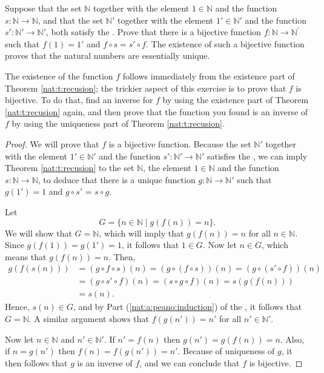 \Newpage
\begin{exercise} %
	Suppose that the set $\mathbb{N}$ together with the element $1 \in \mathbb{N}$ and the function $s: \mathbb{N} \to \mathbb{N}$, and that the set $\mathbb{N}'$ together with the element $1' \in \mathbb{N}'$ and the function $s': \mathbb{N}' \to \mathbb{N}'$, both satisfy the . Prove that there is a bijective function $f: \mathbb{N} \to \mathbb{N}^{\prime}$ such that $f(1)=1'$ and $f \circ s=s' \circ f$. The existence of such a bijective function proves that the natural numbers are essentially unique.

	The existence of the function $f$ follows immediately from the existence part of Theorem \ref{nat:t:recusion}; the trickier aspect of this exercise is to prove that $f$ is bijective. To do that, find an inverse for $f$ by using the existence part of Theorem \ref{nat:t:recusion} again, and then prove that the function you found is an inverse of $f$ by using the uniqueness part of Theorem \ref{nat:t:recusion}.
\end{exercise}

\begin{proof}
	We will prove that $f$ is a bijective function. Because the set $\mathbb{N}'$ together with the element $1' \in \mathbb{N}'$ and the function $s': \mathbb{N}' \to \mathbb{N}'$ satisfies the , we can imply Theorem \ref{nat:t:recusion} to the set $\mathbb{N}$, the element $1 \in \mathbb{N}$ and the function $s: \mathbb{N} \to \mathbb{N}$, to deduce that there is a unique function $g: \mathbb{N} \to \mathbb{N}'$ such that $g(1') = 1$ and $g \circ s'$ = $s \circ g$.

	Let
	\[
		G = \{ n \in \mathbb{N} \mid g(f(n)) = n \}.
	\]
	We will show that $G = \mathbb{N}$, which will imply that $g(f(n)) = n$ for all $n \in \mathbb{N}$. Since ${g(f(1)) = g(1') = 1}$, it follows that $1 \in G$. Now let $n \in G$, which means that $g(f(n)) = n$. Then,
	\begin{align*}
		g(f(s(n))) & = (g \circ f \circ s)(n) = (g \circ (f \circ s))(n) = (g \circ (s' \circ f))(n) \\
		           & = (g \circ s' \circ f)(n) = (s \circ g \circ f)(n) = s(g(f(n)))                 \\
		           & = s(n).
	\end{align*}
	Hence, $s(n) \in G$, and by Part (\ref{nat:a:peano:induction}) of the , it follows that $G = \mathbb{N}$. A similar argument shows that $f(g(n')) = n'$ for all $n' \in \mathbb{N}'$.

	Now let $n \in \mathbb{N}$ and $n' \in \mathbb{N}'$. If $n' = f(n)$ then $g(n') = g(f(n)) = n$. Also, if $n = g(n')$ then $f(n) = f(g(n')) = n'$. Because of uniqueness of $g$, it then follows that $g$ is an inverse of $f$, and we can conclude that $f$ is bijective.
\end{proof}

